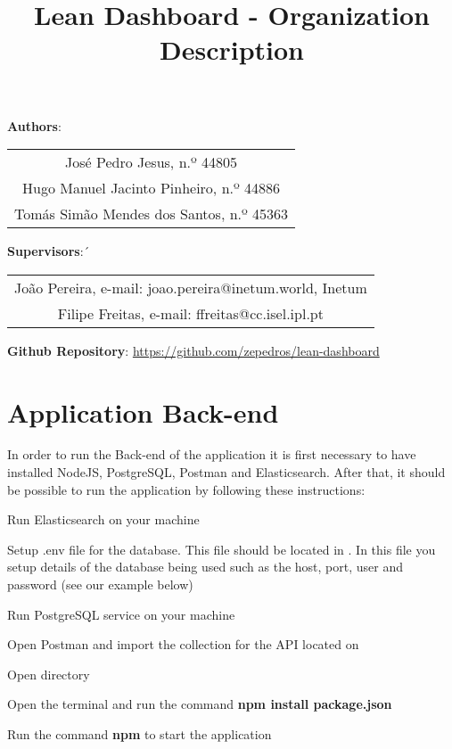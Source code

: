 \documentclass{article}
\title{\huge\textbf{Lean Dashboard - Organization Description}}
\begin{document}
\maketitle

\textbf{Authors}:
\begin{center}
\begin{tabular}{ c }
 José Pedro Jesus, n.º 44805 \\
 Hugo Manuel Jacinto Pinheiro, n.º 44886 \\
 Tomás Simão Mendes dos Santos, n.º 45363
\end{tabular}
\end{center}

\textbf{Supervisors}:´
\begin{center}
\begin{tabular}{ c }
    João Pereira, e-mail: joao.pereira@inetum.world, Inetum\\
    Filipe Freitas, e-mail: ffreitas@cc.isel.ipl.pt\\
\end{tabular}
\end{center}


\textbf{Github Repository}: \url{https://github.com/zepedros/lean-dashboard}

\section{Application Back-end}
In order to run the Back-end of the application it is first necessary to have installed NodeJS, PostgreSQL, Postman and Elasticsearch. After that, it should be possible to run the application by following these instructions:

\begin{center}
\begin{steps}
  \item Run Elasticsearch on your machine
  \item Setup .env file for the database. This file should be located in . In this file you setup details of the database being used such as the host, port, user and password (see our example below)
  \item Run PostgreSQL service on your machine
  \item Open Postman and import the collection for the API located on 
  \item Open directory 
  \item Open the terminal and run the command \textbf{npm install package.json}
  \item Run the command \textbf{npm } to start the application
 
\end{steps}
\end{center}
\end{document}
